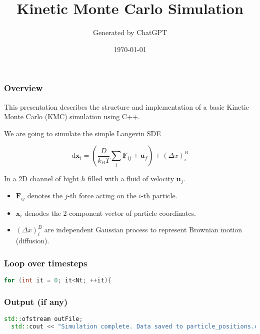 \documentclass{beamer}
\title{Kinetic Monte Carlo Simulation}
\author{Generated by ChatGPT}
\date{\today}
\begin{document}
\begin{frame}[fragile]
  \titlepage
\end{frame}

\begin{frame}[fragile]
  \frametitle{Overview}
  This presentation describes the structure and implementation of a basic Kinetic Monte Carlo (KMC) simulation using C++.
  
  We are going to simulate the simple Langevin SDE 
  
  \[
  \mathrm{d}\mathbf{x}_{i} = \left( \dfrac{D}{k_{B}T} \displaystyle\sum_{i}\mathbf{F}_{ij} + \mathbf{u}_{f}\right) +
  \left(\Delta x \right)_{i}^{B}
  \]
  
  In a 2D channel of hight $h$ filled with a fluid of velocity $\mathbf{u}_{f}$.
  \begin{itemize}
\item  $\mathbf{F}_{ij}$ denotes the $j$-th force acting on the $i$-th particle.
\item  $\mathbf{x}_{i}$ denodes the 2-component vector of particle coordinates.
\item  $\left(\Delta x \right)_{i}^{B}$ are independent Gaussian process to represent Brownian motion (diffusion).
  \end{itemize}
\end{frame}

\begin{frame}[fragile]
  \frametitle{Loop over timesteps}
  
\begin{minipage}{\linewidth}
\begin{minipage}{0.97\linewidth}
\begin{lstlisting}[language=C++]
  for (int it = 0; it<Nt; ++it){    
\end{lstlisting}
\end{minipage}
\end{minipage}

\end{frame}

\begin{frame}[fragile]
  \frametitle{Output (if any)}
  
\begin{minipage}{\linewidth}
\begin{minipage}{0.97\linewidth}
\begin{lstlisting}[language=C++]
  std::ofstream outFile;
  std::cout << "Simulation complete. Data saved to particle_positions.csv.\n"; 
\end{lstlisting}
\end{minipage}
\end{minipage}

\end{frame}
\end{document}
